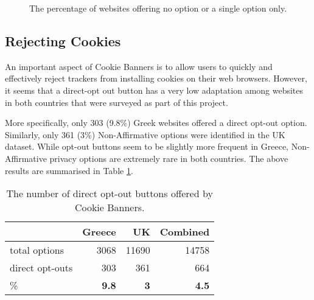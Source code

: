 \documentclass[../main.tex]{subfiles}
\begin{document}
\begin{figure}[ht]
    \centering
    \caption{The percentage of websites offering no option or a single option only.}
    \label{fig:single_options}
\end{figure}

\subsection{Rejecting Cookies}

An important aspect of Cookie Banners is to allow users to quickly and effectively reject trackers from installing cookies on their web browsers. However, it seems that a direct-opt out button has a very low adaptation among websites in both countries that were surveyed as part of this project.

More specifically, only 303 (9.8\%) Greek websites offered a direct opt-out option. Similarly, only 361 (3\%) Non-Affirmative options were identified in the UK dataset. While opt-out buttons seem to be slightly more frequent in Greece, Non-Affirmative privacy options are extremely rare in both countries. The above results are summarised in Table \ref{tab:opt_outs}.

\begin{table}[ht]
    \centering
    \begin{tabular}{@{}lrrr@{}}
        \toprule
                              & Greece          & UK                & Combined            \\ \midrule
        total options         & 3068            & 11690             & 14758           \\
        direct opt-outs       & 303             & 361               & 664             \\
        \%                    & \textbf{9.8}    & \textbf{3}        & \textbf{4.5}  \\ \bottomrule
    \end{tabular}
    \caption{The number of direct opt-out buttons offered by Cookie Banners.}
    \label{tab:opt_outs}
\end{table}
\end{document}

